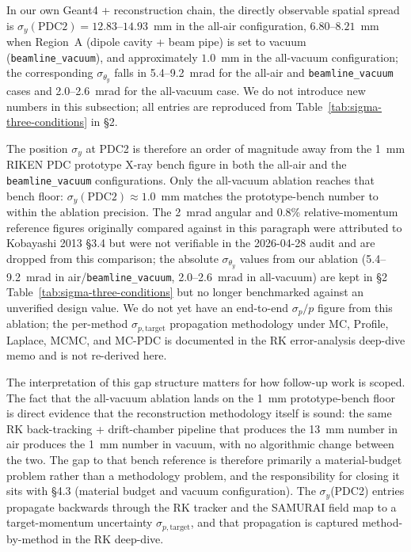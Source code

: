 \documentclass[a4paper, 11pt]{article}
\begin{document}
In our own Geant4 + reconstruction chain, the directly observable spatial spread is $\sigma_y(\text{PDC2}) = 12.83$--$14.93$~mm in the all-air configuration, $6.80$--$8.21$~mm when Region~A (dipole cavity + beam pipe) is set to vacuum (\texttt{beamline\_vacuum}), and approximately $1.0$~mm in the all-vacuum configuration; the corresponding $\sigma_{\theta_y}$ falls in 5.4--9.2~mrad for the all-air and \texttt{beamline\_vacuum} cases and 2.0--2.6~mrad for the all-vacuum case. We do not introduce new numbers in this subsection; all entries are reproduced from Table~\ref{tab:sigma-three-conditions} in §2.

The position $\sigma_y$ at PDC2 is therefore an order of magnitude away from the 1~mm RIKEN PDC prototype X-ray bench figure in both the all-air and the \texttt{beamline\_vacuum} configurations. Only the all-vacuum ablation reaches that bench floor: $\sigma_y(\text{PDC2}) \approx 1.0$~mm matches the prototype-bench number to within the ablation precision. The 2~mrad angular and 0.8\% relative-momentum reference figures originally compared against in this paragraph were attributed to Kobayashi 2013 §3.4 but were not verifiable in the 2026-04-28 audit and are dropped from this comparison; the absolute $\sigma_{\theta_y}$ values from our ablation (5.4--9.2~mrad in air/\texttt{beamline\_vacuum}, 2.0--2.6~mrad in all-vacuum) are kept in §2 Table~\ref{tab:sigma-three-conditions} but no longer benchmarked against an unverified design value. We do not yet have an end-to-end $\sigma_p/p$ figure from this ablation; the per-method $\sigma_{p,\text{target}}$ propagation methodology under MC, Profile, Laplace, MCMC, and MC-PDC is documented in the RK error-analysis deep-dive memo and is not re-derived here.

The interpretation of this gap structure matters for how follow-up work is scoped. The fact that the all-vacuum ablation lands on the 1~mm prototype-bench floor is direct evidence that the reconstruction methodology itself is sound: the same RK back-tracking + drift-chamber pipeline that produces the 13~mm number in air produces the 1~mm number in vacuum, with no algorithmic change between the two. The gap to that bench reference is therefore primarily a material-budget problem rather than a methodology problem, and the responsibility for closing it sits with §4.3 (material budget and vacuum configuration). The $\sigma_y$(PDC2) entries propagate backwards through the RK tracker and the SAMURAI field map to a target-momentum uncertainty $\sigma_{p,\text{target}}$, and that propagation is captured method-by-method in the RK deep-dive.
\end{document}
